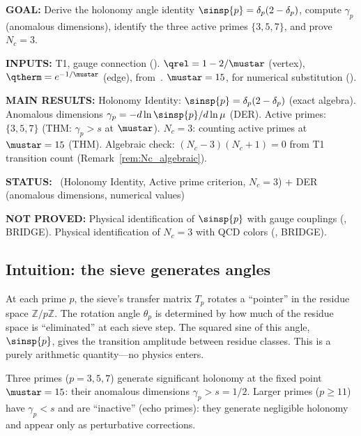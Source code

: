 \documentclass[12pt,a4paper]{article}
\begin{document}
\begin{statusbox}
\textbf{GOAL:}
  Derive the holonomy angle identity $\sinsp{p} = \delta_p(2-\delta_p)$,
  compute $\gamma_p$ (anomalous dimensions), identify the three active
  primes $\{3,5,7\}$, and prove $N_c = 3$.

\textbf{INPUTS:}
  T1, gauge connection (\cite{companion_M1}).
  $\qrel = 1 - 2/\mustar$ (vertex), $\qtherm = e^{-1/\mustar}$ (edge),
  from~\cite{companion_M1}.
  $\mustar = 15$, for numerical substitution (\cite{companion_M3}).

\textbf{MAIN RESULTS:}
  Holonomy Identity: $\sinsp{p} = \delta_p(2-\delta_p)$ (exact algebra).
  Anomalous dimensions $\gamma_p = -d\ln\sinsp{p}/d\ln\mu$ (DER).
  Active primes: $\{3,5,7\}$ (THM: $\gamma_p > s$ at $\mustar$).
  $N_c = 3$: counting active primes at $\mustar = 15$ (THM).
  Algebraic check: $(N_c - 3)(N_c + 1) = 0$ from T1 transition count (Remark~\ref{rem:Nc_algebraic}).

\textbf{STATUS:}
  \THMTAG~(Holonomy Identity, Active prime criterion, $N_c = 3$)
  + DER (anomalous dimensions, numerical values)

\textbf{NOT PROVED:}
  Physical identification of $\sinsp{p}$ with gauge couplings (\cite{companion_M5}, BRIDGE).
  Physical identification of $N_c = 3$ with QCD colors (\cite{companion_M5}, BRIDGE).
\end{statusbox}

\subsection{Intuition: the sieve generates angles}
\label{sec:ch6_intuition}

At each prime $p$, the sieve's transfer matrix $T_p$ rotates a
``pointer'' in the residue space $\mathbb{Z}/p\mathbb{Z}$.
The rotation angle $\theta_p$ is determined by how much of the residue
space is ``eliminated'' at each sieve step. The squared sine of this
angle, $\sinsp{p}$, gives the transition amplitude between residue
classes. This is a purely arithmetic quantity---no physics enters.

Three primes ($p = 3, 5, 7$) generate significant holonomy at the
fixed point $\mustar = 15$: their anomalous dimensions $\gamma_p > s = 1/2$.
Larger primes ($p \geq 11$) have $\gamma_p < s$ and are ``inactive''
(echo primes): they generate negligible holonomy and appear only as
perturbative corrections.
\end{document}
